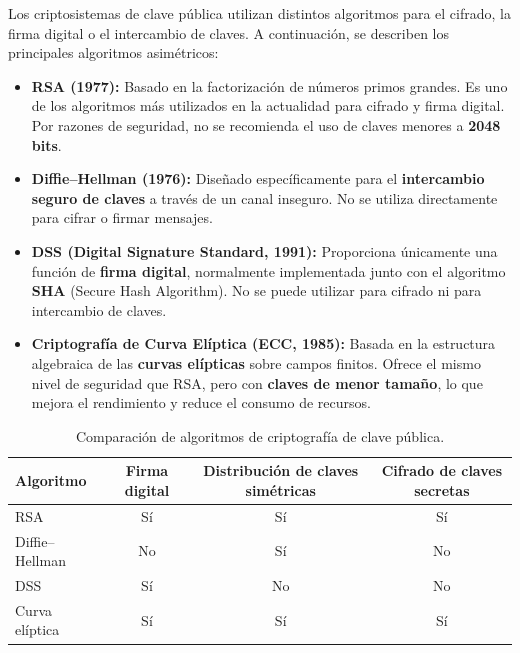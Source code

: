 \documentclass[11pt,a4paper]{article}
\begin{document}
Los criptosistemas de clave pública utilizan distintos algoritmos para el cifrado, la firma digital o el intercambio de claves. A continuación, se describen los principales algoritmos asimétricos:

\begin{itemize}
    \item \textbf{RSA (1977):}
    Basado en la factorización de números primos grandes. Es uno de los algoritmos más utilizados en la actualidad para cifrado y firma digital.
    Por razones de seguridad, no se recomienda el uso de claves menores a \textbf{2048 bits}.

    \item \textbf{Diffie--Hellman (1976):}
    Diseñado específicamente para el \textbf{intercambio seguro de claves} a través de un canal inseguro.
    No se utiliza directamente para cifrar o firmar mensajes.

    \item \textbf{DSS (Digital Signature Standard, 1991):}
    Proporciona únicamente una función de \textbf{firma digital}, normalmente implementada junto con el algoritmo \textbf{SHA} (Secure Hash Algorithm).
    No se puede utilizar para cifrado ni para intercambio de claves.

    \item \textbf{Criptografía de Curva Elíptica (ECC, 1985):}
    Basada en la estructura algebraica de las \textbf{curvas elípticas} sobre campos finitos.
    Ofrece el mismo nivel de seguridad que RSA, pero con \textbf{claves de menor tamaño}, lo que mejora el rendimiento y reduce el consumo de recursos.
\end{itemize}

\begin{table}[h!]
\centering
\begin{tabular}{|l|c|c|c|}
\hline
\textbf{Algoritmo} & \textbf{Firma digital} & \textbf{Distribución de claves simétricas} & \textbf{Cifrado de claves secretas} \\ \hline
RSA & Sí & Sí & Sí \\ \hline
Diffie--Hellman & No & Sí & No \\ \hline
DSS & Sí & No & No \\ \hline
Curva elíptica & Sí & Sí & Sí \\ \hline
\end{tabular}
\caption{Comparación de algoritmos de criptografía de clave pública.}
\label{tab:algoritmos_cripto}
\end{table}
\end{document}
